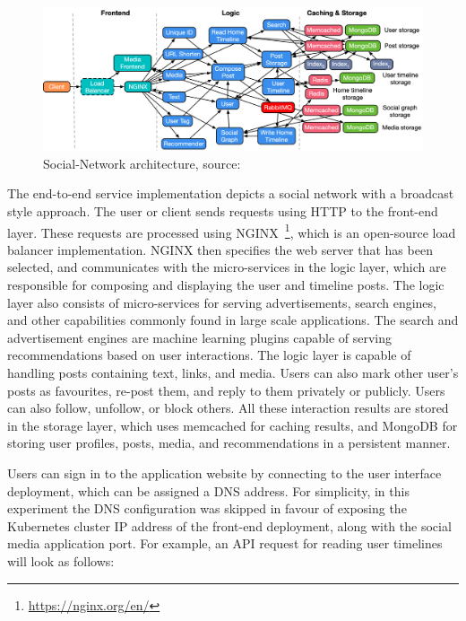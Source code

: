 \begin{figure}[htb]
    \centering
    \caption[Social-Network architecture]{Social-Network architecture, source:~\cite{gan2019open}}
    \label{fig:social-network-arch}
    \includegraphics[width=1.0\linewidth]{Figures/Social-Network-Architecture.pdf}
\end{figure}

The end-to-end service implementation depicts a social network with a broadcast style approach. The user or client sends requests using HTTP to the front-end layer. These requests are processed using NGINX~\footnote{\url{https://nginx.org/en/}}, which is an open-source load balancer implementation. NGINX then specifies the web server that has been selected, and communicates with the micro-services in the logic layer, which are responsible for composing and displaying the user and timeline posts. The logic layer also consists of micro-services for serving advertisements, search engines, and other capabilities commonly found in large scale applications. The search and advertisement engines are machine learning plugins capable of serving recommendations based on user interactions. The logic layer is capable of handling posts containing text, links, and media. Users can also mark other user's posts as favourites, re-post them, and reply to them privately or publicly. Users can also follow, unfollow, or block others. All these interaction results are stored in the storage layer, which uses memcached for caching results, and MongoDB for storing user profiles, posts, media, and recommendations in a persistent manner.

Users can sign in to the application website by connecting to the user interface deployment, which can be assigned a DNS address. For simplicity, in this experiment the DNS configuration was skipped in favour of exposing the Kubernetes cluster IP address of the front-end deployment, along with the social media application port. For example, an API request for reading user timelines will look as follows:\par

